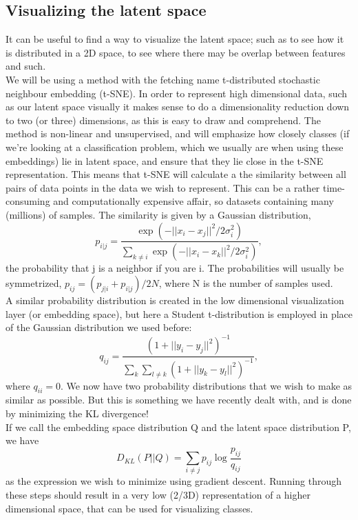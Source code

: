 \subsection{Visualizing the latent space}
It can be useful to find a way to visualize the latent space; such as to see how it is distributed in a 2D space, to see where there may be overlap between features and such.\\
We will be using a method with the fetching name t-distributed stochastic neighbour embedding (t-SNE). In order to represent high dimensional data, such as our latent space visually it makes sense to do a dimensionality reduction down to two (or three) dimensions, as this is easy to draw and comprehend. The method is non-linear and unsupervised, and will emphasize how closely classes (if we're looking at a classification problem, which we usually are when using these embeddings) lie in latent space, and ensure that they lie close in the t-SNE representation. 
This means that t-SNE will calculate a the similarity between all pairs of data points in the data we wish to represent. This can be a rather time-consuming and computationally expensive affair, so datasets containing many (millions) of samples. The similarity is given by a Gaussian distribution,
\begin{equation}
    p_{i|j}=\frac{\exp (-||x_i-x_j||^2/2\sigma_i^2)}{\sum_{k\neq i}\exp(-||x_i-x_k||^2/2\sigma_i^2)},
\end{equation}
the probability that j is a neighbor if you are i. The probabilities will usually be symmetrized, $p_{ij}=(p_{j|i}+p_{i|j})/2N$, where N is the number of samples used.\\ 
A similar probability distribution is created in the low dimensional visualization layer (or embedding space), but here a Student t-distribution is employed in place of the Gaussian distribution we used before: \begin{equation}
    q_{ij}=\frac{(1+||y_i-y_j||^2)^{-1}}{\sum_k\sum_{l\neq k}(1+||y_k-y_l||^2)^{-1}},
\end{equation}
where $q_{ii}=0$.
We now have two probability distributions that we wish to make as similar as possible. But this is something we have recently dealt with, and is done by minimizing the KL divergence!\\
If we call the embedding space distribution Q and the latent space distribution P, we have
\begin{equation}
    D_{KL}(P||Q)=\sum_{i\neq j}p_{ij}\log\frac{p_{ij}}{q_{ij}}
\end{equation}
as the expression we wish to minimize using gradient descent.
Running through these steps should result in a very low (2/3D) representation of a higher dimensional space, that can be used for visualizing classes.\\
